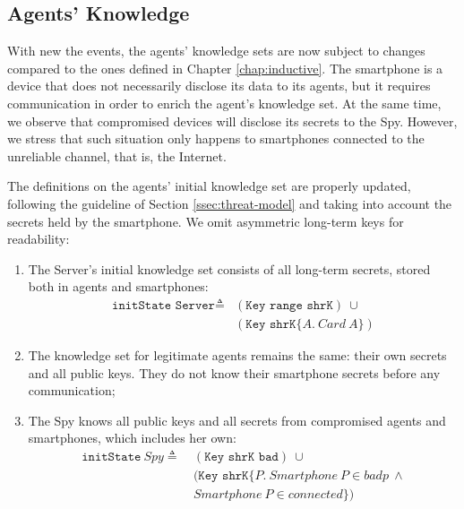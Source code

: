 \subsection{Agents' Knowledge}
\label{ssec:agents-knowledge-smartphone}
With new the events, the agents' knowledge sets are now subject to changes compared to the ones defined in Chapter \ref{chap:inductive}. The smartphone is a device that does not necessarily disclose its data to its agents, but it requires communication in order to enrich the agent's knowledge set. At the same time, we observe that compromised devices will disclose its secrets to the Spy. However, we stress that such situation only happens to smartphones connected to the unreliable channel, that is, the Internet.

The definitions on the agents' initial knowledge set are properly updated, following the guideline of Section \ref{ssec:threat-model} and taking into account the secrets held by the smartphone. We omit asymmetric long-term keys for readability:
%
\begin{enumerate}
  \item The Server's initial knowledge set consists of all long-term secrets, stored both in agents and smartphones:
  \begin{equation*}
    \begin{split}
      \texttt{initState Server} \triangleq
      & (\texttt{Key range shrK}) \ \cup \\
      & (\texttt{Key shrK}\{A.\ Card\ A\})
    \end{split}
  \end{equation*}
  \item The knowledge set for legitimate agents remains the same: their own secrets and all public keys. They do not know their smartphone secrets before any communication;

  \item The Spy knows all public keys and all secrets from compromised agents and smartphones, which includes her own:
  \begin{equation*}
    \begin{split}
      \texttt{initState}\ Spy \triangleq\
      & (\texttt{Key shrK bad}) \ \cup \\
      & (\texttt{Key shrK}\{P.\ Smartphone\ P \in badp\ \wedge \\
      & Smartphone\ P \in connected\})
    \end{split}
  \end{equation*}
\end{enumerate}


